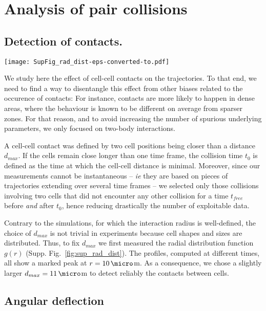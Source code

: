 \documentclass[11pt, twocolumn]{article}
\newcommand\rev[1]{{#1}}
\begin{document}
\section{Analysis of pair collisions}

\subsection{Detection of contacts.}

\begin{figure*}[ht!]
\centering
\texttt{[image: SupFig\_rad\_dist-eps-converted-to.pdf]}

\caption{Radial distribution function, averaged over all the
  experiments, at various time points.}
\label{fig:sup_rad_dist}
\end{figure*}

We study here the effect of cell-cell contacts on the trajectories. To
that end, we need to find a way to disentangle this effect from other
biases related to the occurence of contacts: For instance, contacts
are more likely to happen in dense areas, where the behaviour is known
to be different on average from sparser zones. For that reason, and to
avoid increasing the number of spurious underlying parameters, we only
focused on two-body interactions.

A cell-cell contact was defined by two cell positions being closer
than a distance $d_{max}$. If the cells remain close longer than one
time frame, the collision time $t_0$ is defined as the time at which
the cell-cell distance is minimal. Moreover, since our measurements
cannot be instantaneous -- \textit{ie} they are based on pieces of
trajectories extending over several time frames -- we selected only
those collisions involving two cells that did not encounter any other
collision for a time $t_{free}$ before \textit{and} after $t_0$, hence
reducing drastically the number of exploitable data.

Contrary to the simulations, for which the interaction radius is
well-defined, the choice of $d_{max}$ is not trivial in experiments
because cell shapes and sizes are distributed. Thus, to fix $d_{max}$
we first measured the radial distribution function $g(r)$
(Supp. Fig.~\ref{fig:sup_rad_dist}). The profiles, computed at
different times, all show a marked peak at $r=10\,\micro$m. As a
consequence, we chose a slightly larger $d_{max}=11\,\micro$m to
detect reliably the contacts between cells.

\subsection{Angular deflection}
\end{document}
